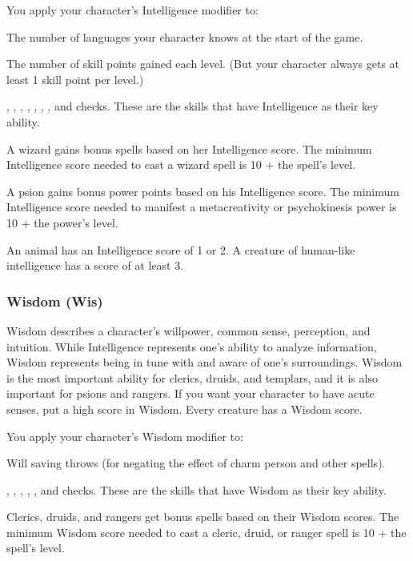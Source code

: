 You apply your character's Intelligence modifier to:
\begin{itemize*}
\item The number of languages your character knows at the start of the game.
\item The number of skill points gained each level. (But your character always gets at least 1 skill point per level.)
\item {}, , , , , , , and  checks. These are the skills that have Intelligence as their key ability.
\end{itemize*}

A wizard gains bonus spells based on her Intelligence score. The minimum Intelligence score needed to cast a wizard spell is 10 + the spell's level.

A psion gains bonus power points based on his Intelligence score. The minimum Intelligence score needed to manifest a metacreativity or psychokinesis power is 10 + the power's level.

An animal has an Intelligence score of 1 or 2. A creature of human-like intelligence has a score of at least 3.

\subsubsection{Wisdom (Wis)}
Wisdom describes a character's willpower, common sense, perception, and intuition. While Intelligence represents one's ability to analyze information, Wisdom represents being in tune with and aware of one's surroundings. Wisdom is the most important ability for clerics, druids, and templars, and it is also important for psions and rangers. If you want your character to have acute senses, put a high score in Wisdom. Every creature has a Wisdom score.

You apply your character's Wisdom modifier to:
\begin{itemize*}
\item Will saving throws (for negating the effect of charm person and other spells).
\item {}, , , , , and  checks. These are the skills that have Wisdom as their key ability.
\end{itemize*}

Clerics, druids, and rangers get bonus spells based on their Wisdom scores. The minimum Wisdom score needed to cast a cleric, druid, or ranger spell is 10 + the spell's level.

